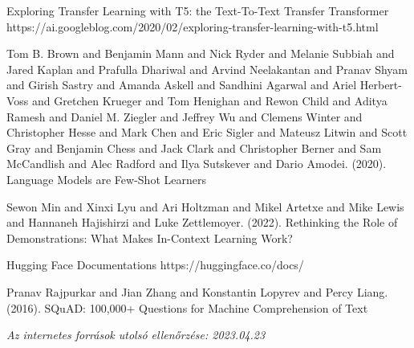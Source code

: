 \documentclass[12pt,a4paper]{report}
\begin{document}
\begin{thebibliography}{100}
 Exploring Transfer Learning with T5: the Text-To-Text Transfer Transformer https://ai.googleblog.com/2020/02/exploring-transfer-learning-with-t5.html

 Tom B. Brown and Benjamin Mann and Nick Ryder and Melanie Subbiah and Jared Kaplan and Prafulla Dhariwal and Arvind Neelakantan and Pranav Shyam and Girish Sastry and Amanda Askell and Sandhini Agarwal and Ariel Herbert-Voss and Gretchen Krueger and Tom Henighan and Rewon Child and Aditya Ramesh and Daniel M. Ziegler and Jeffrey Wu and Clemens Winter and Christopher Hesse and Mark Chen and Eric Sigler and Mateusz Litwin and Scott Gray and Benjamin Chess and Jack Clark and Christopher Berner and Sam McCandlish and Alec Radford and Ilya Sutskever and Dario Amodei. (2020). Language Models are Few-Shot Learners

 Sewon Min and Xinxi Lyu and Ari Holtzman and Mikel Artetxe and Mike Lewis and Hannaneh Hajishirzi and Luke Zettlemoyer. (2022). Rethinking the Role of Demonstrations: What Makes In-Context Learning Work?

 Hugging Face Documentations https://huggingface.co/docs/

 Pranav Rajpurkar and Jian Zhang and Konstantin Lopyrev and Percy Liang. (2016). SQuAD: 100,000+ Questions for Machine Comprehension of Text
\end{thebibliography}


\noindent \textit{Az internetes források utolsó ellenőrzése: 2023.04.23}

\pagestyle{empty}

\newpage


\end{document}
